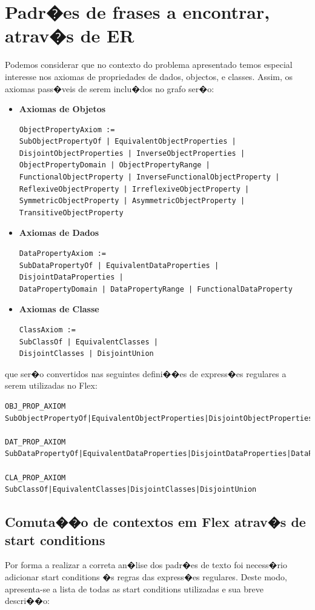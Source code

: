 \documentclass{report}
\begin{document}
    \section{Padr�es de frases a encontrar, atrav�s de ER}
    Podemos considerar que no contexto do problema apresentado temos especial interesse nos axiomas de propriedades de dados, objectos, e classes.
    Assim, os axiomas pass�veis de serem inclu�dos no grafo ser�o:
    \begin{itemize}
    \item \textbf{Axiomas de Objetos}
    \begin{verbatim}
ObjectPropertyAxiom :=
SubObjectPropertyOf | EquivalentObjectProperties |
DisjointObjectProperties | InverseObjectProperties |
ObjectPropertyDomain | ObjectPropertyRange |
FunctionalObjectProperty | InverseFunctionalObjectProperty |
ReflexiveObjectProperty | IrreflexiveObjectProperty |
SymmetricObjectProperty | AsymmetricObjectProperty |
TransitiveObjectProperty
\end{verbatim}

\item \textbf{Axiomas de Dados}
\begin{verbatim}
DataPropertyAxiom :=
SubDataPropertyOf | EquivalentDataProperties | DisjointDataProperties |
DataPropertyDomain | DataPropertyRange | FunctionalDataProperty
\end{verbatim}
\item \textbf{Axiomas de Classe}
\begin{verbatim}
ClassAxiom := 
SubClassOf | EquivalentClasses | 
DisjointClasses | DisjointUnion
\end{verbatim}

\end{itemize}

que ser�o convertidos nas seguintes defini��es de express�es regulares a serem utilizadas no Flex:
\begin{lstlisting}
OBJ_PROP_AXIOM SubObjectPropertyOf|EquivalentObjectProperties|DisjointObjectProperties|InverseObjectProperties|ObjectPropertyDomain|ObjectPropertyRange|FunctionalObjectProper

DAT_PROP_AXIOM SubDataPropertyOf|EquivalentDataProperties|DisjointDataProperties|DataPropertyDomain|DataPropertyRange|FunctionalDataProperty

CLA_PROP_AXIOM SubClassOf|EquivalentClasses|DisjointClasses|DisjointUnion
\end{lstlisting}


\subsection{Comuta��o de contextos em Flex atrav�s de start conditions}
Por forma a realizar a correta an�lise dos padr�es de texto foi necess�rio adicionar start conditions �s regras das express�es regulares. Deste modo, apresenta-se a lista de todas as start conditions utilizadas e sua breve descri��o:
\end{document}
